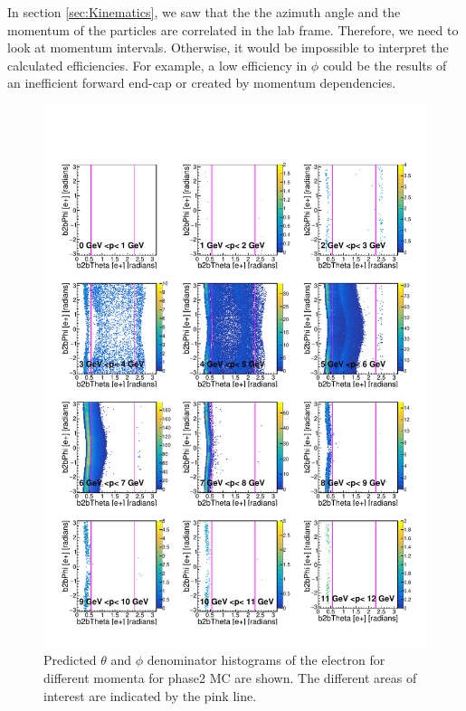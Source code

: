 \documentclass[a4paper,11pt,twosided,final,german,openbib,pdftex,listof=totoc,bibliography=totoc]{scrbook}
\begin{document}
In section \ref{sec:Kinematics}, we saw that the the azimuth angle and the momentum of the particles are correlated in the lab frame. Therefore, we need to look at momentum intervals. Otherwise, it would be impossible to interpret the calculated efficiencies. For example, a low efficiency in $\phi$ could be the results of an inefficient forward end-cap or created by momentum dependencies.




\begin{figure}[h!]
	\includegraphics[width=\textwidth]{Plots/master/RTPMemD_MC.pdf}
	\caption[Denominator $\theta$-$\phi$ Electron Momentum MC]{Predicted $\theta$ and $\phi$ denominator histograms of the electron for different momenta for phase2 MC are shown. The different areas of interest are indicated by the pink line.}
	\label{plt:RTPMemD_MC}
\end{figure}
\end{document}
